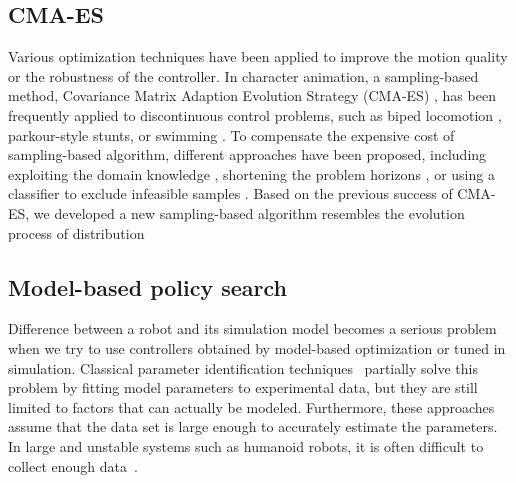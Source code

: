 \subsection{CMA-ES}
Various optimization techniques have been applied to improve the
motion quality or the robustness of the controller.  In character
animation, a sampling-based method, Covariance Matrix Adaption
Evolution Strategy (CMA-ES) \cite{Hansen:2004:CMA}, has been
frequently applied to discontinuous control problems, such as biped
locomotion \cite{Wang:2009:OWC,Wang:2010:OWC,Wang:2012:OLC},
parkour-style stunts\cite{Liu:2012:TRC,Ha:2014:ITD}, or swimming
\cite{Tan:2011:ASC}.  To compensate the expensive cost of
sampling-based algorithm, different approaches have been proposed,
including exploiting the domain knowledge
\cite{Wang:2009:OWC,Wang:2010:OWC,Wang:2012:OLC}, shortening the
problem horizons \cite{Sok:2007:SBB}, or using a classifier to exclude
infeasible samples \cite{Ha:2014:ITD}. Based on the previous success
of CMA-ES, we developed a new sampling-based algorithm resembles the
evolution process of distribution

\subsection{Model-based policy search}
Difference between a robot and its simulation model becomes a serious
problem when we try to use controllers obtained by model-based
optimization or tuned in simulation.
Classical parameter identification
techniques~\cite{bib-khalil-identification} partially solve this
problem by fitting model parameters to experimental data, but they
are still limited to factors that can actually be modeled. 
Furthermore, these approaches assume that the data set is large enough
to accurately estimate the parameters.
In large and unstable systems such as humanoid robots, it is often
difficult to collect enough data~\cite{bib-humanoids2011-calibration}.

